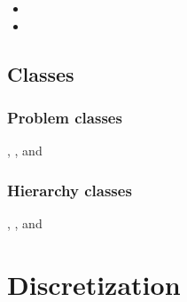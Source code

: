 \documentclass[10pt]{article}
\begin{document}
\begin{itemize}
\item {}
\item {}
\end{itemize}


\subsubsection{}

\subsubsection{}

\subsection{Classes} \label{ss:classes}

\subsubsection{Problem classes}

, , and 

\subsubsection{Hierarchy classes}

, , and 

\newpage
\section{Discretization} \label{s:discretization}

\newcommand{\indvar}{r}
 \newcommand{\uc}{u(\indvar)}
 \newcommand{\uv}{u(\volel)}
 \newcommand{\us}{u(\surfel)}
\end{document}
